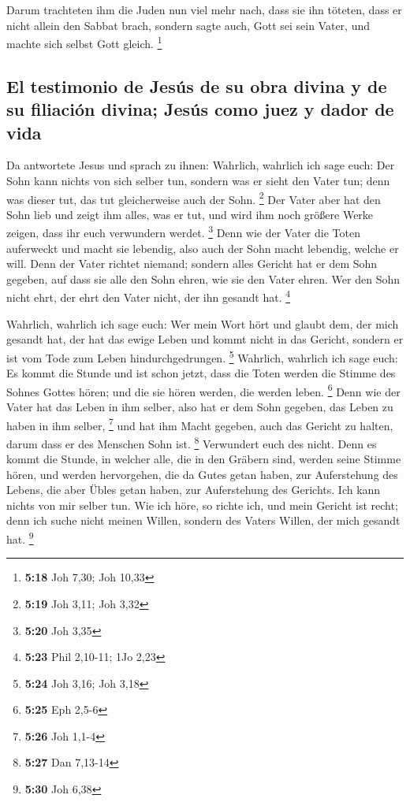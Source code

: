  Darum trachteten ihm die Juden nun viel mehr nach, dass
sie ihn töteten, dass er nicht allein den Sabbat brach, sondern sagte
auch, Gott sei sein Vater, und machte sich selbst Gott gleich.
\footnote{\textbf{5:18} Joh 7,30; Joh 10,33}

\hypertarget{el-testimonio-de-jesuxfas-de-su-obra-divina-y-de-su-filiaciuxf3n-divina-jesuxfas-como-juez-y-dador-de-vida}{%
\subsection{El testimonio de Jesús de su obra divina y de su filiación
divina; Jesús como juez y dador de
vida}\label{el-testimonio-de-jesuxfas-de-su-obra-divina-y-de-su-filiaciuxf3n-divina-jesuxfas-como-juez-y-dador-de-vida}}

 Da antwortete Jesus und sprach zu ihnen: Wahrlich,
wahrlich ich sage euch: Der Sohn kann nichts von sich selber tun,
sondern was er sieht den Vater tun; denn was dieser tut, das tut
gleicherweise auch der Sohn. \footnote{\textbf{5:19} Joh 3,11; Joh 3,32}
 Der Vater aber hat den Sohn lieb und zeigt ihm alles,
was er tut, und wird ihm noch größere Werke zeigen, dass ihr euch
verwundern werdet. \footnote{\textbf{5:20} Joh 3,35} 
Denn wie der Vater die Toten auferweckt und macht sie lebendig, also
auch der Sohn macht lebendig, welche er will.  Denn der
Vater richtet niemand; sondern alles Gericht hat er dem Sohn gegeben,
 auf dass sie alle den Sohn ehren, wie sie den Vater
ehren. Wer den Sohn nicht ehrt, der ehrt den Vater nicht, der ihn
gesandt hat. \footnote{\textbf{5:23} Phil 2,10-11; 1Jo 2,23}

 Wahrlich, wahrlich ich sage euch: Wer mein Wort hört und
glaubt dem, der mich gesandt hat, der hat das ewige Leben und kommt
nicht in das Gericht, sondern er ist vom Tode zum Leben
hindurchgedrungen. \footnote{\textbf{5:24} Joh 3,16; Joh 3,18}
 Wahrlich, wahrlich ich sage euch: Es kommt die Stunde
und ist schon jetzt, dass die Toten werden die Stimme des Sohnes Gottes
hören; und die sie hören werden, die werden leben. \footnote{\textbf{5:25}
  Eph 2,5-6}  Denn wie der Vater hat das Leben in ihm
selber, also hat er dem Sohn gegeben, das Leben zu haben in ihm selber,
\footnote{\textbf{5:26} Joh 1,1-4}  und hat ihm Macht
gegeben, auch das Gericht zu halten, darum dass er des Menschen Sohn
ist. \footnote{\textbf{5:27} Dan 7,13-14}  Verwundert
euch des nicht. Denn es kommt die Stunde, in welcher alle, die in den
Gräbern sind, werden seine Stimme hören,  und werden
hervorgehen, die da Gutes getan haben, zur Auferstehung des Lebens, die
aber Übles getan haben, zur Auferstehung des Gerichts. 
Ich kann nichts von mir selber tun. Wie ich höre, so richte ich, und
mein Gericht ist recht; denn ich suche nicht meinen Willen, sondern des
Vaters Willen, der mich gesandt hat. \footnote{\textbf{5:30} Joh 6,38}

